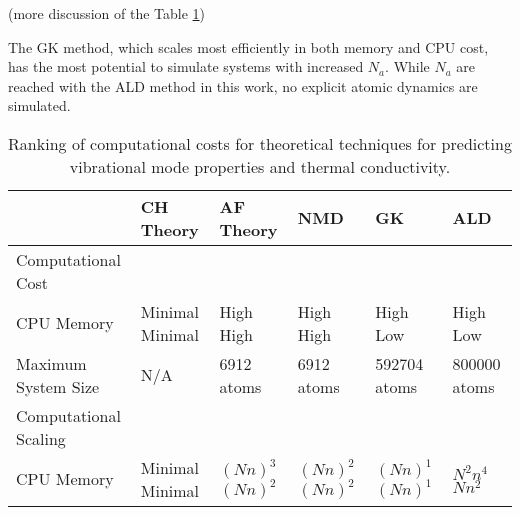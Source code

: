 (more discussion of the Table \ref{T-comparison-cost})

The GK method, which scales most efficiently in both memory and CPU 
cost, has the most potential to simulate systems with increased 
$N_a$. While $N_a$ are reached with the ALD method in this work, 
no explicit atomic dynamics are simulated. 

\begin{center}
\begin{table}
\small
\caption{\label{T-comparison-cost}Ranking of computational costs 
for theoretical 
techniques for predicting vibrational mode properties and thermal 
conductivity.}
\begin{tabular}{p{0.9in}|p{0.9in}|p{0.9in}|p{0.9in}|p{0.9in}|p{0.9in}}
\hline\hline
&CH Theory 
&AF Theory
&NMD
&GK
&ALD\\ 
\hline
Computational Cost\\
\hline
CPU\newline
Memory 
&Minimal \newline Minimal
&High \newline High 
&High \newline High 
&High \newline Low 
&High \newline Low \\
\hline
Maximum System Size
&N/A
&6912 atoms
&6912 atoms
&592704 atoms
&800000 atoms\\
\hline
Computational Scaling\\
\hline
CPU\newline
Memory 
&Minimal \newline Minimal
&$(Nn)^{3}$ \newline $(Nn)^{2}$ 
&$(Nn)^{2}$ \newline $(Nn)^{2}$ 
&$(Nn)^{1}$ \newline $(Nn)^{1}$ 
&$N^{2}n^{4}$ \newline $Nn^{2}$  \\
\hline\hline
\end{tabular}
\end{table}
\end{center}
\clearpage